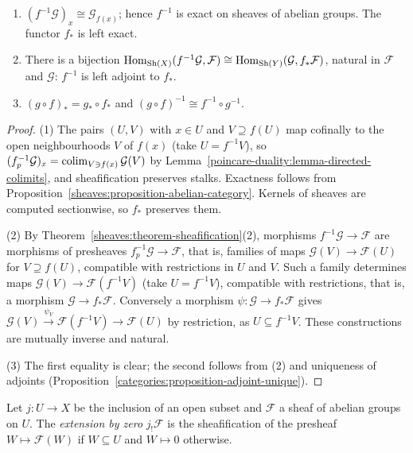 \begin{proposition}\label{sheaves:proposition-images}
\begin{enumerate}
\item $(f^{-1}\mathcal{G})_x \cong \mathcal{G}_{f(x)}$; hence $f^{-1}$ is exact on sheaves of abelian groups. The functor $f_*$ is left exact.
\item There is a bijection $\operatorname{Hom}_{\mathrm{Sh}(X)}(f^{-1}\mathcal{G}, \mathcal{F}) \cong \operatorname{Hom}_{\mathrm{Sh}(Y)}(\mathcal{G}, f_*\mathcal{F})$, natural in $\mathcal{F}$ and $\mathcal{G}$: $f^{-1}$ is left adjoint to
$f_*$.
\item $(g \circ f)_* = g_* \circ f_*$ and $(g \circ f)^{-1} \cong f^{-1} \circ g^{-1}$.
\end{enumerate}
\end{proposition}

\begin{proof}
(1) The pairs $(U, V)$ with $x \in U$ and $V \supseteq f(U)$ map cofinally to the open neighbourhoods $V$ of $f(x)$ (take $U = f^{-1}V$), so
$(f^{-1}_p\mathcal{G})_x = \operatorname*{colim}_{V \ni f(x)}\mathcal{G}(V)$ by Lemma~\ref{poincare-duality:lemma-directed-colimits}, and sheafification preserves stalks. Exactness follows from
Proposition~\ref{sheaves:proposition-abelian-category}. Kernels of sheaves are computed sectionwise, so $f_*$ preserves them.

(2) By Theorem~\ref{sheaves:theorem-sheafification}(2), morphisms $f^{-1}\mathcal{G} \to \mathcal{F}$ are morphisms of presheaves $f_p^{-1}\mathcal{G} \to \mathcal{F}$, that is, families of
maps $\mathcal{G}(V) \to \mathcal{F}(U)$ for $V \supseteq f(U)$, compatible with restrictions in $U$ and $V$. Such a family determines maps $\mathcal{G}(V) \to \mathcal{F}(f^{-1}V)$ (take
$U = f^{-1}V$), compatible with restrictions, that is, a morphism $\mathcal{G} \to f_*\mathcal{F}$. Conversely a morphism $\psi \colon \mathcal{G} \to f_*\mathcal{F}$ gives
$\mathcal{G}(V) \xrightarrow{\psi_V} \mathcal{F}(f^{-1}V) \to \mathcal{F}(U)$ by restriction, as $U \subseteq f^{-1}V$. These constructions are mutually inverse and natural.

(3) The first equality is clear; the second follows from (2) and uniqueness of adjoints (Proposition~\ref{categories:proposition-adjoint-unique}).
\end{proof}

\begin{definition}\label{sheaves:definition-extension-by-zero}
Let $j \colon U \to X$ be the inclusion of an open subset and $\mathcal{F}$ a sheaf of abelian groups on $U$. The \emph{extension by zero} $j_!\mathcal{F}$ is the sheafification of the
presheaf $W \mapsto \mathcal{F}(W)$ if $W \subseteq U$ and $W \mapsto 0$ otherwise.
\end{definition}


